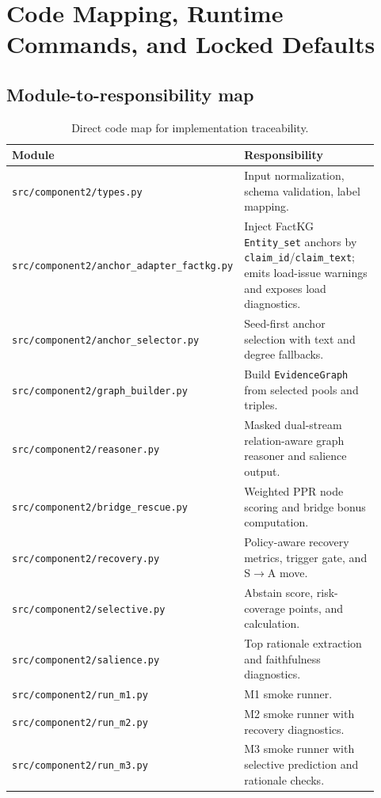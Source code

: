 \section{Code Mapping, Runtime Commands, and Locked Defaults}
\label{sec:code-mapping}

\subsection{Module-to-responsibility map}
\begin{table}[H]
\centering
\begin{tabular}{@{}p{0.34\linewidth}p{0.58\linewidth}@{}}
\toprule
Module & Responsibility \\
\midrule
\texttt{src/component2/types.py} & Input normalization, schema validation, label mapping. \\
\texttt{src/component2/anchor\_adapter\_factkg.py} & Inject FactKG \texttt{Entity\_set} anchors by \texttt{claim\_id}/\texttt{claim\_text}; emits load-issue warnings and exposes load diagnostics. \\
\texttt{src/component2/anchor\_selector.py} & Seed-first anchor selection with text and degree fallbacks. \\
\texttt{src/component2/graph\_builder.py} & Build \texttt{EvidenceGraph} from selected pools and triples. \\
\texttt{src/component2/reasoner.py} & Masked dual-stream relation-aware graph reasoner and salience output. \\
\texttt{src/component2/bridge\_rescue.py} & Weighted PPR node scoring and bridge bonus computation. \\
\texttt{src/component2/recovery.py} & Policy-aware recovery metrics, trigger gate, and S$\rightarrow$A move. \\
\texttt{src/component2/selective.py} & Abstain score, risk-coverage points, and \AURC{} calculation. \\
\texttt{src/component2/salience.py} & Top rationale extraction and faithfulness diagnostics. \\
\texttt{src/component2/run\_m1.py} & M1 smoke runner. \\
\texttt{src/component2/run\_m2.py} & M2 smoke runner with recovery diagnostics. \\
\texttt{src/component2/run\_m3.py} & M3 smoke runner with selective prediction and rationale checks. \\
\bottomrule
\end{tabular}
\caption{Direct code map for implementation traceability.}
\label{tab:module-map}
\end{table}

